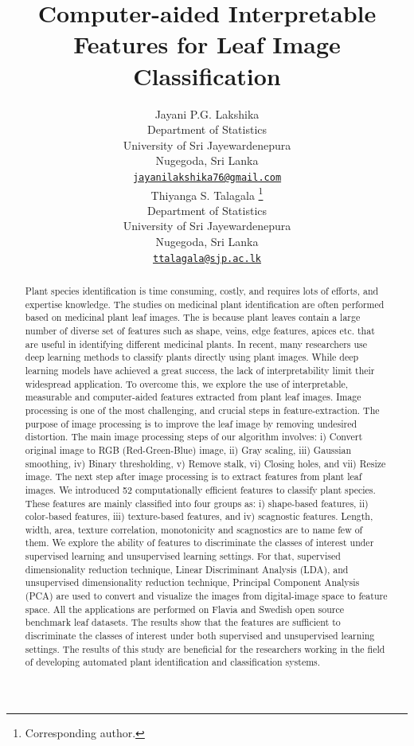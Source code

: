\documentclass{article}
\title{Computer-aided Interpretable Features for Leaf Image Classification}
\author{
    Jayani P.G. Lakshika
   \\
    Department of Statistics \\
    University of Sri Jayewardenepura \\
  Nugegoda, Sri Lanka \\
  \texttt{\href{mailto:jayanilakshika76@gmail.com}{\nolinkurl{jayanilakshika76@gmail.com}}} \\
   \And
    Thiyanga S. Talagala
    \thanks{Corresponding author.}
   \\
    Department of Statistics \\
    University of Sri Jayewardenepura \\
  Nugegoda, Sri Lanka \\
  \texttt{\href{mailto:ttalagala@sjp.ac.lk}{\nolinkurl{ttalagala@sjp.ac.lk}}} \\
  }
\begin{document}
\maketitle

\def\tightlist{}


\begin{abstract}
Plant species identification is time consuming, costly, and requires
lots of efforts, and expertise knowledge. The studies on medicinal plant
identification are often performed based on medicinal plant leaf images.
The is because plant leaves contain a large number of diverse set of
features such as shape, veins, edge features, apices etc. that are
useful in identifying different medicinal plants. In recent, many
researchers use deep learning methods to classify plants directly using
plant images. While deep learning models have achieved a great success,
the lack of interpretability limit their widespread application. To
overcome this, we explore the use of interpretable, measurable and
computer-aided features extracted from plant leaf images. Image
processing is one of the most challenging, and crucial steps in
feature-extraction. The purpose of image processing is to improve the
leaf image by removing undesired distortion. The main image processing
steps of our algorithm involves: i) Convert original image to RGB
(Red-Green-Blue) image, ii) Gray scaling, iii) Gaussian smoothing, iv)
Binary thresholding, v) Remove stalk, vi) Closing holes, and vii) Resize
image. The next step after image processing is to extract features from
plant leaf images. We introduced 52 computationally efficient features
to classify plant species. These features are mainly classified into
four groups as: i) shape-based features, ii) color-based features, iii)
texture-based features, and iv) scagnostic features. Length, width,
area, texture correlation, monotonicity and scagnostics are to name few
of them. We explore the ability of features to discriminate the classes
of interest under supervised learning and unsupervised learning
settings. For that, supervised dimensionality reduction technique,
Linear Discriminant Analysis (LDA), and unsupervised dimensionality
reduction technique, Principal Component Analysis (PCA) are used to
convert and visualize the images from digital-image space to feature
space. All the applications are performed on Flavia and Swedish open
source benchmark leaf datasets. The results show that the features are
sufficient to discriminate the classes of interest under both supervised
and unsupervised learning settings. The results of this study are
beneficial for the researchers working in the field of developing
automated plant identification and classification systems.
\end{abstract}
\end{document}
